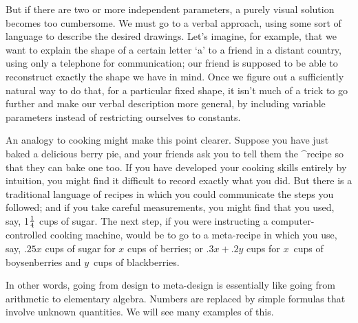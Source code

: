 But if there are two or more independent parameters, a purely visual solution
becomes too cumbersome. We must go to a verbal approach, using some sort
of language to describe the desired drawings. Let's imagine, for example,
that we want to explain the shape of a certain letter `a' to a friend in
a distant country, using only a telephone for communication; our friend
is supposed to be able to reconstruct exactly the shape we have in mind.
Once we figure out a sufficiently natural way to do that, for a particular
fixed shape, it isn't much of a trick to go further and make our verbal
description more general, by including variable parameters instead of
restricting ourselves to constants.

An analogy to cooking might make this point clearer. Suppose you have just
baked a delicious berry pie, and your friends ask you to tell them the
^{recipe} so that they can bake one too. If you have developed your cooking
skills entirely by intuition, you might find it difficult to record exactly
what you did. But there is a traditional language of recipes in which you
could communicate the steps you followed; and if you take careful measurements,
you might find that you used, say, 1$1\over4$ cups of sugar. The next step,
if you were instructing a computer-controlled cooking machine, would be to
go to a meta-recipe in which you use, say, $.25x$ cups of sugar for $x$
cups of berries; or $.3x+.2y$ cups for $x$~cups of boysenberries and
$y$~cups of blackberries.

In other words, going from design to meta-design is essentially like
going from arithmetic to elementary algebra. Numbers are replaced
by simple formulas that involve unknown quantities. We will see
many examples of this.

